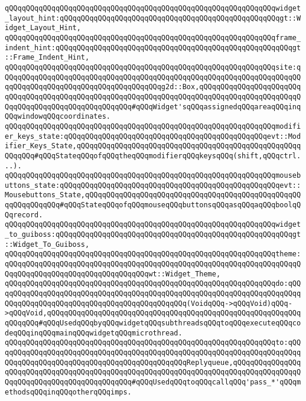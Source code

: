 \verb|qQQqqQQqqQQqqQQqqQQqqQQqqQQqqQQqqQQqqQQqqQQqqQQqqQQqqQQqqQQqqQQqwidget_layout_hint:qQQqqQQqqQQqqQQqqQQqqQQqqQQqqQQqqQQqqQQqqQQqqQQqqQQqgt::Widget_Layout_Hint,|\newline
\verb|qQQqqQQqqQQqqQQqqQQqqQQqqQQqqQQqqQQqqQQqqQQqqQQqqQQqqQQqqQQqqQQqframe_indent_hint:qQQqqQQqqQQqqQQqqQQqqQQqqQQqqQQqqQQqqQQqqQQqqQQqqQQqqQQqgt::Frame_Indent_Hint,|\newline
\verb|qQQqqQQqqQQqqQQqqQQqqQQqqQQqqQQqqQQqqQQqqQQqqQQqqQQqqQQqqQQqqQQqsite:qQQqqQQqqQQqqQQqqQQqqQQqqQQqqQQqqQQqqQQqqQQqqQQqqQQqqQQqqQQqqQQqqQQqqQQqqQQqqQQqqQQqqQQqqQQqqQQqqQQqqQQqqQQqg2d::Box,qQQqqQQqqQQqqQQqqQQqqQQqqQQqqQQqqQQqqQQqqQQqqQQqqQQqqQQqqQQqqQQqqQQqqQQqqQQqqQQqqQQqqQQqqQQqqQQqqQQqqQQqqQQqqQQqqQQqqQQqqQQq#qQQqWidget'sqQQqassignedqQQqareaqQQqinqQQqwindowqQQqcoordinates.|\newline
\verb|qQQqqQQqqQQqqQQqqQQqqQQqqQQqqQQqqQQqqQQqqQQqqQQqqQQqqQQqqQQqqQQqmodifier_keys_state:qQQqqQQqqQQqqQQqqQQqqQQqqQQqqQQqqQQqqQQqqQQqqQQqevt::Modifier_Keys_State,qQQqqQQqqQQqqQQqqQQqqQQqqQQqqQQqqQQqqQQqqQQqqQQqqQQqqQQqqQQq#qQQqStateqQQqofqQQqtheqQQqmodifierqQQqkeysqQQq(shift,qQQqctrl...).|\newline
\verb|qQQqqQQqqQQqqQQqqQQqqQQqqQQqqQQqqQQqqQQqqQQqqQQqqQQqqQQqqQQqqQQqmousebuttons_state:qQQqqQQqqQQqqQQqqQQqqQQqqQQqqQQqqQQqqQQqqQQqqQQqqQQqevt::Mousebuttons_State,qQQqqQQqqQQqqQQqqQQqqQQqqQQqqQQqqQQqqQQqqQQqqQQqqQQqqQQqqQQqqQQq#qQQqStateqQQqofqQQqmouseqQQqbuttonsqQQqasqQQqaqQQqboolqQQqrecord.|\newline
\verb|qQQqqQQqqQQqqQQqqQQqqQQqqQQqqQQqqQQqqQQqqQQqqQQqqQQqqQQqqQQqqQQqwidget_to_guiboss:qQQqqQQqqQQqqQQqqQQqqQQqqQQqqQQqqQQqqQQqqQQqqQQqqQQqqQQqgt::Widget_To_Guiboss,|\newline
\verb|qQQqqQQqqQQqqQQqqQQqqQQqqQQqqQQqqQQqqQQqqQQqqQQqqQQqqQQqqQQqqQQqtheme:qQQqqQQqqQQqqQQqqQQqqQQqqQQqqQQqqQQqqQQqqQQqqQQqqQQqqQQqqQQqqQQqqQQqqQQqqQQqqQQqqQQqqQQqqQQqqQQqqQQqqQQqwt::Widget_Theme,|\newline
\verb|qQQqqQQqqQQqqQQqqQQqqQQqqQQqqQQqqQQqqQQqqQQqqQQqqQQqqQQqqQQqqQQqdo:qQQqqQQqqQQqqQQqqQQqqQQqqQQqqQQqqQQqqQQqqQQqqQQqqQQqqQQqqQQqqQQqqQQqqQQqqQQqqQQqqQQqqQQqqQQqqQQqqQQqqQQqqQQqqQQqqQQq(VoidqQQq->qQQqVoid)qQQq->qQQqVoid,qQQqqQQqqQQqqQQqqQQqqQQqqQQqqQQqqQQqqQQqqQQqqQQqqQQqqQQqqQQqqQQqqQQq#qQQqUsedqQQqbyqQQqwidgetqQQqsubthreadsqQQqtoqQQqexecuteqQQqcodeqQQqinqQQqmainqQQqwidgetqQQqmicrothread.|\newline
\verb|qQQqqQQqqQQqqQQqqQQqqQQqqQQqqQQqqQQqqQQqqQQqqQQqqQQqqQQqqQQqqQQqto:qQQqqQQqqQQqqQQqqQQqqQQqqQQqqQQqqQQqqQQqqQQqqQQqqQQqqQQqqQQqqQQqqQQqqQQqqQQqqQQqqQQqqQQqqQQqqQQqqQQqqQQqqQQqqQQqqQQqReplyqueue,qQQqqQQqqQQqqQQqqQQqqQQqqQQqqQQqqQQqqQQqqQQqqQQqqQQqqQQqqQQqqQQqqQQqqQQqqQQqqQQqqQQqqQQqqQQqqQQqqQQqqQQqqQQqqQQqqQQq#qQQqUsedqQQqtoqQQqcallqQQq'pass_*'qQQqmethodsqQQqinqQQqotherqQQqimps.|\newline
